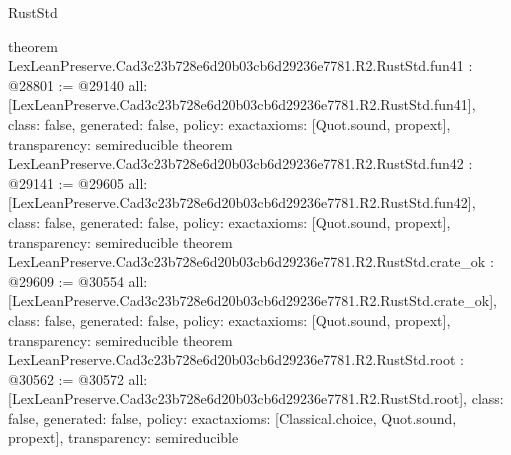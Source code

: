 \begin{lexlean}{RustStd}
\begin{coremodule}
{}
theorem LexLeanPreserve.Cad3c23b728e6d20b03cb6d29236e7781.R2.RustStd.fun41 : @28801 := @29140 {
  all: [LexLeanPreserve.Cad3c23b728e6d20b03cb6d29236e7781.R2.RustStd.fun41],
  class: false,
  generated: false,
  policy: exact{axioms: [Quot.sound, propext]},
  transparency: semireducible
}
theorem LexLeanPreserve.Cad3c23b728e6d20b03cb6d29236e7781.R2.RustStd.fun42 : @29141 := @29605 {
  all: [LexLeanPreserve.Cad3c23b728e6d20b03cb6d29236e7781.R2.RustStd.fun42],
  class: false,
  generated: false,
  policy: exact{axioms: [Quot.sound, propext]},
  transparency: semireducible
}
theorem LexLeanPreserve.Cad3c23b728e6d20b03cb6d29236e7781.R2.RustStd.crate_ok : @29609 := @30554 {
  all: [LexLeanPreserve.Cad3c23b728e6d20b03cb6d29236e7781.R2.RustStd.crate_ok],
  class: false,
  generated: false,
  policy: exact{axioms: [Quot.sound, propext]},
  transparency: semireducible
}
theorem LexLeanPreserve.Cad3c23b728e6d20b03cb6d29236e7781.R2.RustStd.root : @30562 := @30572 {
  all: [LexLeanPreserve.Cad3c23b728e6d20b03cb6d29236e7781.R2.RustStd.root],
  class: false,
  generated: false,
  policy: exact{axioms: [Classical.choice, Quot.sound, propext]},
  transparency: semireducible
}


\end{coremodule}
\end{lexlean}
